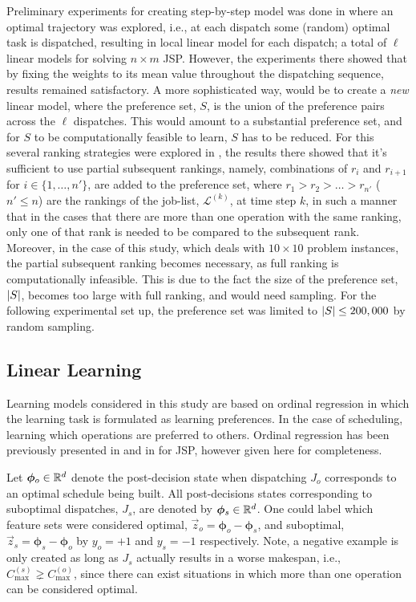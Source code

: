 \documentclass[smallextended]{svjour3}
\renewcommand{\vphi}{\bm{\phi}}
\begin{document}
Preliminary experiments for creating step-by-step model was done in 
\cite{InRu11a} where an optimal trajectory was explored, i.e., at each dispatch 
some (random) optimal task is dispatched, resulting in local linear model for 
each dispatch; a total of $\ell$ linear models for solving $n\times m$ JSP. 
However, the experiments there showed that by fixing the weights to its mean 
value throughout the dispatching sequence, results remained satisfactory.
A more sophisticated way, would be to create a \emph{new} linear model, where 
the preference set, $S$, is the union of the preference pairs across the $\ell$ 
dispatches. 
This would amount to a substantial preference set, and for $S$ to be 
computationally feasible to learn, $S$ has to be reduced. For this several 
ranking strategies were explored in \cite{InRu15a}, the results there showed 
that it's sufficient to use partial subsequent rankings, namely, combinations 
of $r_i$ and $r_{i+1}$ for $i\in\{1,\ldots,n'\}$, are added to the preference 
set, where $r_1>r_2>\ldots>r_{n'}$ ($n'\leq n$) are the rankings of the 
job-list, $\mathcal{L}^{(k)}$, at time step $k$, in such a manner that in the 
cases that there are more than one operation with the same ranking, only one of 
that rank is needed to be compared to the subsequent rank. 
Moreover, in the case of this study, which deals with $10\times 10$ problem 
instances, the partial subsequent ranking becomes necessary, as full ranking is 
computationally infeasible. This is due to the fact the size of the preference 
set, $\lvert S\rvert$, becomes too large with full ranking, and would need sampling.
For the following experimental set up, the preference set was limited to 
$\lvert S\rvert\leq200,000$ by random sampling.

\subsection{Linear Learning}\label{sec:liblinear}

Learning models considered in this study are based on ordinal regression in 
which the learning task is formulated as learning preferences. In the case of 
scheduling, learning which operations are preferred to others. Ordinal 
regression has been previously presented in \cite{Ru06:PPSN} and in 
\cite{InRu11a} for JSP, however given here for completeness. 

Let $\vphi_{o}\in\R^d$ denote the post-decision state when dispatching $J_o$ 
corresponds to an optimal schedule being built. All post-decisions states 
corresponding to suboptimal dispatches, $J_s$, are denoted by 
$\vphi_{s}\in\R^d$. One could label which feature sets were considered optimal, 
$\vec{z}_{o}=\vphi_{o}-\vphi_{s}$, and suboptimal, 
$\vec{z}_{s}=\vphi_{s}-\vphi_{o}$ by $y_o=+1$ and $y_s=-1$ respectively. 
Note, a negative example is only created as long as $J_s$ actually results in a 
worse makespan, i.e., $C_{\max}^{(s)}\gneq C_{\max}^{(o)}$, since there can 
exist situations in which more than one operation can be considered optimal.
\end{document}
